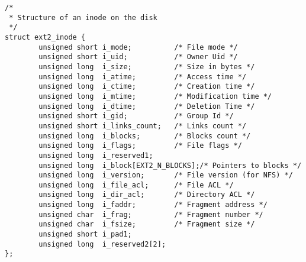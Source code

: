 \begin{verbatim}
/*
 * Structure of an inode on the disk
 */
struct ext2_inode {
        unsigned short i_mode;          /* File mode */
        unsigned short i_uid;           /* Owner Uid */
        unsigned long  i_size;          /* Size in bytes */
        unsigned long  i_atime;         /* Access time */
        unsigned long  i_ctime;         /* Creation time */
        unsigned long  i_mtime;         /* Modification time */
        unsigned long  i_dtime;         /* Deletion Time */
        unsigned short i_gid;           /* Group Id */
        unsigned short i_links_count;   /* Links count */
        unsigned long  i_blocks;        /* Blocks count */
        unsigned long  i_flags;         /* File flags */
        unsigned long  i_reserved1;
        unsigned long  i_block[EXT2_N_BLOCKS];/* Pointers to blocks */
        unsigned long  i_version;       /* File version (for NFS) */
        unsigned long  i_file_acl;      /* File ACL */
        unsigned long  i_dir_acl;       /* Directory ACL */
        unsigned long  i_faddr;         /* Fragment address */
        unsigned char  i_frag;          /* Fragment number */
        unsigned char  i_fsize;         /* Fragment size */
        unsigned short i_pad1;
        unsigned long  i_reserved2[2];
};
\end{verbatim}


